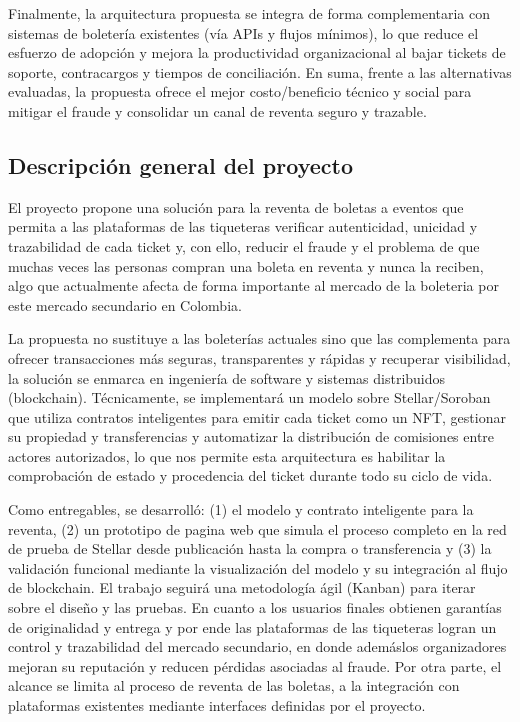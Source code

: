 \documentclass[12pt,a4paper]{article}
\begin{document}
Finalmente, la arquitectura propuesta se integra de forma complementaria con sistemas de boletería existentes (vía APIs y flujos mínimos), lo que reduce el esfuerzo de adopción y mejora la productividad organizacional al bajar tickets de soporte, contracargos y tiempos de conciliación. En suma, frente a las alternativas evaluadas, la propuesta ofrece el mejor costo/beneficio técnico y social para mitigar el fraude y consolidar un canal de reventa seguro y trazable.


\subsection{Descripción general del proyecto}
El proyecto propone una solución para la reventa de boletas a eventos que permita a las plataformas de las tiqueteras verificar autenticidad, unicidad y trazabilidad de cada ticket y, con ello, reducir el fraude y el problema de que muchas veces las personas compran una boleta en reventa y nunca la reciben, algo que actualmente afecta de forma importante al mercado de la boleteria por este mercado secundario en Colombia. 

La propuesta no sustituye a las boleterías actuales sino que las complementa para ofrecer transacciones más seguras, transparentes y rápidas y recuperar visibilidad, la solución se enmarca en ingeniería de software y sistemas distribuidos (blockchain). Técnicamente, se implementará un modelo sobre Stellar/Soroban que utiliza contratos inteligentes para emitir cada ticket como un NFT, gestionar su propiedad y transferencias y automatizar la distribución de comisiones entre actores autorizados, lo que nos permite esta arquitectura es habilitar la comprobación de estado y procedencia del ticket durante todo su ciclo de vida.

Como entregables, se desarrolló: (1) el modelo y contrato inteligente para la reventa, (2) un prototipo de pagina web que simula el proceso completo en la red de prueba de Stellar desde publicación hasta la compra o transferencia y (3) la validación funcional mediante la visualización del modelo y su integración al flujo de blockchain. El trabajo seguirá una metodología ágil (Kanban) para iterar sobre el diseño y las pruebas. En cuanto a los usuarios finales obtienen garantías de originalidad y entrega y por ende las plataformas de las tiqueteras logran un control y trazabilidad del mercado secundario, en donde ademáslos organizadores mejoran su reputación y reducen pérdidas asociadas al fraude. Por otra parte, el alcance se limita al proceso de reventa de las boletas, a la integración con plataformas existentes mediante interfaces definidas por el proyecto.
\end{document}
